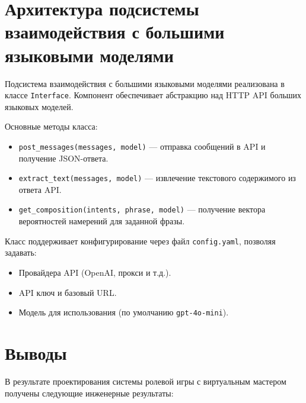 \section{Архитектура подсистемы взаимодействия с большими языковыми моделями}

Подсистема взаимодействия с большими языковыми моделями реализована в классе \texttt{Interface}. Компонент обеспечивает абстракцию над HTTP API больших языковых моделей.

Основные методы класса:
\begin{itemize}
	\item \texttt{post\_messages(messages, model)} --- отправка сообщений в API и получение JSON-ответа.
	
	\item \texttt{extract\_text(messages, model)} --- извлечение текстового содержимого из ответа API.
	
	\item \texttt{get\_composition(intents, phrase, model)} --- получение вектора вероятностей намерений для заданной фразы.
\end{itemize}

Класс поддерживает конфигурирование через файл \texttt{config.yaml}, позволяя задавать:
\begin{itemize}
	\item Провайдера API (OpenAI, прокси и т.д.).
	
	\item API ключ и базовый URL.
	
	\item Модель для использования (по умолчанию \texttt{gpt-4o-mini}).
\end{itemize}


\section{Выводы}

В результате проектирования системы ролевой игры с виртуальным мастером получены следующие инженерные результаты:

